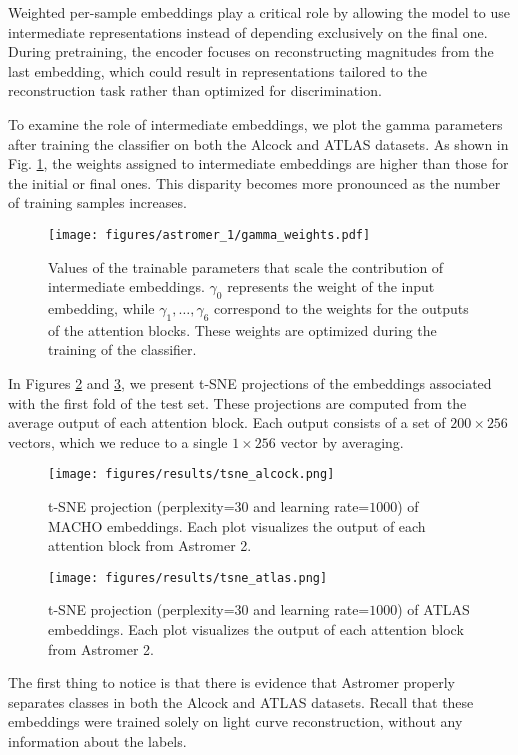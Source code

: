 Weighted per-sample embeddings play a critical role by allowing the model to use intermediate representations instead of depending exclusively on the final one. During pretraining, the encoder focuses on reconstructing magnitudes from the last embedding, which could result in representations tailored to the reconstruction task rather than optimized for discrimination.

To examine the role of intermediate embeddings, we plot the gamma parameters after training the classifier on both the Alcock and ATLAS datasets. As shown in Fig. \ref{fig:gammaweights}, the weights assigned to intermediate embeddings are higher than those for the initial or final ones. This disparity becomes more pronounced as the number of training samples increases.
\begin{figure}
    \centering
    \texttt{[image: figures/astromer\_1/gamma\_weights.pdf]}
    \caption{Values of the trainable parameters that scale the contribution of intermediate embeddings. $\gamma_0$ represents the weight of the input embedding, while $\gamma_1, \ldots, \gamma_6$ correspond to the weights for the outputs of the attention blocks. These weights are optimized during the training of the classifier.}
    \label{fig:gammaweights}
\end{figure}

In Figures \ref{fig:alcock-emb} and \ref{fig:atlas-emb}, we present t-SNE projections of the embeddings associated with the first fold of the test set. These projections are computed from the average output of each attention block. Each output consists of a set of $200 \times 256$ vectors, which we reduce to a single $1 \times 256$ vector by averaging.
\begin{figure}
    \centering
    \texttt{[image: figures/results/tsne\_alcock.png]}
    \caption{t-SNE projection (perplexity=$30$ and learning rate=$1000$) of MACHO embeddings. Each plot visualizes the output of each attention block from Astromer 2.}
    \label{fig:alcock-emb}
\end{figure}

\begin{figure}
    \centering
    \texttt{[image: figures/results/tsne\_atlas.png]}
    \caption{t-SNE projection (perplexity=$30$ and learning rate=$1000$) of ATLAS embeddings. Each plot visualizes the output of each attention block from Astromer 2.}
    \label{fig:atlas-emb}
\end{figure}

The first thing to notice is that there is evidence that Astromer properly separates classes in both the Alcock and ATLAS datasets. Recall that these embeddings were trained solely on light curve reconstruction, without any information about the labels.

